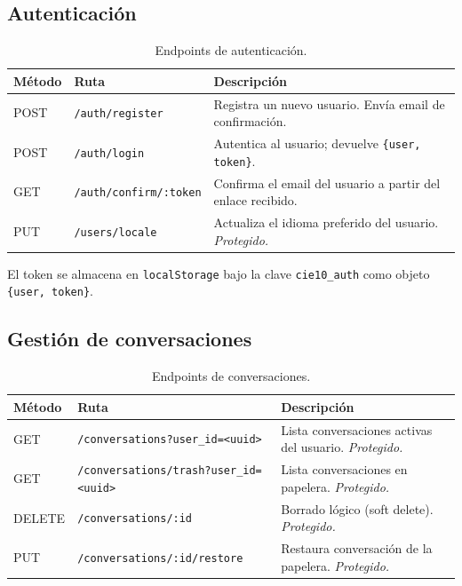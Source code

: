 \subsection{Autenticación}

\begin{table}[h]
\centering
\caption{Endpoints de autenticación.}
\label{tab:api-auth}
\begin{tabular}{llp{7cm}}
\hline
\textbf{Método} & \textbf{Ruta} & \textbf{Descripción} \\
\hline
POST & \texttt{/auth/register} & Registra un nuevo usuario. Envía email de confirmación. \\
POST & \texttt{/auth/login} & Autentica al usuario; devuelve \texttt{\{user, token\}}. \\
GET & \texttt{/auth/confirm/:token} & Confirma el email del usuario a partir del enlace recibido. \\
PUT & \texttt{/users/locale} & Actualiza el idioma preferido del usuario. \emph{Protegido.} \\
\hline
\end{tabular}
\end{table}

El token se almacena en \texttt{localStorage} bajo la clave \texttt{cie10\_auth} como objeto \texttt{\{user, token\}}.

\subsection{Gestión de conversaciones}

\begin{table}[h]
\centering
\caption{Endpoints de conversaciones.}
\label{tab:api-conv}
\begin{tabular}{lp{5cm}p{5cm}}
\hline
\textbf{Método} & \textbf{Ruta} & \textbf{Descripción} \\
\hline
GET & \texttt{/conversations?\allowbreak{}user\_id=<uuid>} & Lista conversaciones activas del usuario. \emph{Protegido.} \\
GET & \texttt{/conversations/trash?\allowbreak{}user\_id=<uuid>} & Lista conversaciones en papelera. \emph{Protegido.} \\
DELETE & \texttt{/conversations/:id} & Borrado lógico (soft delete). \emph{Protegido.} \\
PUT & \texttt{/conversations/\allowbreak{}:id/restore} & Restaura conversación de la papelera. \emph{Protegido.} \\
\hline
\end{tabular}
\end{table}

